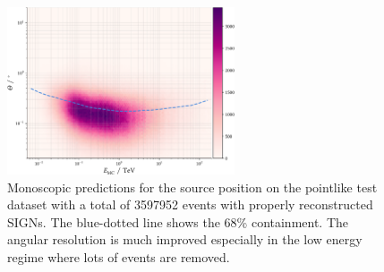 \begin{figure}
    \centering
    \captionsetup{width=0.9\linewidth}
    \includegraphics[width=0.6\textwidth]{../analysis/plots/gamma/tel_vs_energy_correct_signs.pdf}
    \caption{
        Monoscopic predictions for the source position on the pointlike 
        test dataset with a total of 3597952 events with properly reconstructed SIGNs. 
        The blue-dotted line shows the 68\% containment. 
        The angular resolution is much improved especially in the low energy regime
        where lots of events are removed.}
    \label{fig:sens_telescope_gamma_signs}
\end{figure}



